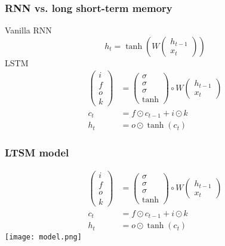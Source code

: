 \documentclass{beamer}
\begin{document}
\begin{frame}
  \frametitle{RNN vs. long short-term memory}
  Vanilla RNN
  \begin{equation*}
    h_t=\tanh\left( W
      \begin{pmatrix}
        h_{t-1} \\ x_t
      \end{pmatrix}
    \right)
  \end{equation*}
  LSTM
  \begin{align*}
    \begin{pmatrix}
      i \\ f \\ o \\ k
    \end{pmatrix}
    &=
    \begin{pmatrix}
      \sigma \\ \sigma \\ \sigma \\ \tanh
    \end{pmatrix}
    \circ
    W
    \begin{pmatrix}
      h_{t-1} \\ x_t
    \end{pmatrix}
    \\
    c_t &= f \odot c_{t-1} + i \odot k \\
    h_t &= o \odot \tanh\left(c_t\right)
  \end{align*}
\end{frame}

\begin{frame}
  \frametitle{LTSM model}
  \begin{align*}
    \begin{pmatrix}
      i \\ f \\ o \\ k
    \end{pmatrix}
    &=
    \begin{pmatrix}
      \sigma \\ \sigma \\ \sigma \\ \tanh
    \end{pmatrix}
    \circ
    W
    \begin{pmatrix}
      h_{t-1} \\ x_t
    \end{pmatrix}
    \\
    c_t &= f \odot c_{t-1} + i \odot k \\
    h_t &= o \odot \tanh\left(c_t\right)
  \end{align*}
  \texttt{[image: model.png]}
\end{frame}
\end{document}
